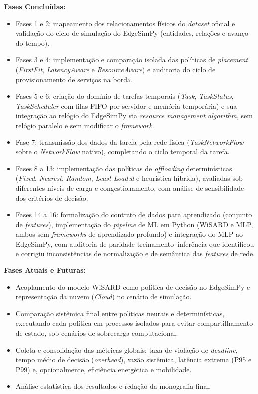 \documentclass[12pt,a4paper]{article}
\begin{document}
\textbf{Fases Concluídas:}
\begin{itemize}
    \item Fases 1 e 2: mapeamento dos relacionamentos físicos do \textit{dataset} oficial e
    validação do ciclo de simulação do EdgeSimPy (entidades, relações e avanço do tempo).
    \item Fases 3 e 4: implementação e comparação isolada das políticas de \textit{placement}
    (\textit{FirstFit}, \textit{LatencyAware} e \textit{ResourceAware}) e auditoria do ciclo de
    provisionamento de serviços na borda.
    \item Fases 5 e 6: criação do domínio de tarefas temporais (\textit{Task}, \textit{TaskStatus},
    \textit{TaskScheduler} com filas FIFO por servidor e memória temporária) e sua integração ao
    relógio do EdgeSimPy via \textit{resource management algorithm}, sem relógio paralelo e sem
    modificar o \textit{framework}.
    \item Fase 7: transmissão dos dados da tarefa pela rede física (\textit{TaskNetworkFlow}
    sobre o \textit{NetworkFlow} nativo), completando o ciclo temporal da tarefa.
    \item Fases 8 a 13: implementação das políticas de \textit{offloading} determinísticas
    (\textit{Fixed}, \textit{Nearest}, \textit{Random}, \textit{Least Loaded} e heurística
    híbrida), avaliadas sob diferentes níveis de carga e congestionamento, com análise de
    sensibilidade dos critérios de decisão.
    \item Fases 14 a 16: formalização do contrato de dados para aprendizado (conjunto de
    \textit{features}), implementação do \textit{pipeline} de ML em Python (WiSARD e MLP, ambos
    sem \textit{frameworks} de aprendizado profundo) e integração do MLP ao EdgeSimPy, com
    auditoria de paridade treinamento--inferência que identificou e corrigiu inconsistências de
    normalização e de semântica das \textit{features} de rede.
\end{itemize}

\textbf{Fases Atuais e Futuras:}
\begin{itemize}
    \item Acoplamento do modelo WiSARD como política de decisão no EdgeSimPy e representação da
    nuvem (\textit{Cloud}) no cenário de simulação.
    \item Comparação sistêmica final entre políticas neurais e determinísticas, executando cada
    política em processos isolados para evitar compartilhamento de estado, sob cenários de
    sobrecarga computacional.
    \item Coleta e consolidação das métricas globais: taxa de violação de \textit{deadline}, tempo
    médio de decisão (\textit{overhead}), vazão sistêmica, latência extrema (P95 e P99) e,
    opcionalmente, eficiência energética e mobilidade.
    \item Análise estatística dos resultados e redação da monografia final.
\end{itemize}
\end{document}
